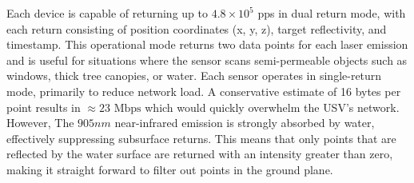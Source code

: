 \documentclass{erauthesis}
\begin{document}
Each device is capable of returning up to $4.8 \times 10^5$ \ac{pps} in dual return mode, with each return consisting of position coordinates (x, y, z), target reflectivity, and timestamp.
This operational mode returns two data points for each laser emission and is useful for situations where the sensor scans semi-permeable objects such as windows, thick tree canopies, or water.
Each sensor operates in single-return mode, primarily to reduce network load.
A conservative estimate of 16 bytes per point results in $\approx 23 \text{ Mbps}$ which would quickly overwhelm the \ac{USV}'s network.
However, The $905 nm$ near-infrared emission is strongly absorbed by water, effectively suppressing subsurface returns.
This means that only points that are reflected by the water surface are returned with an intensity greater than zero, making it straight forward to filter out points in the ground plane.




\end{document}
